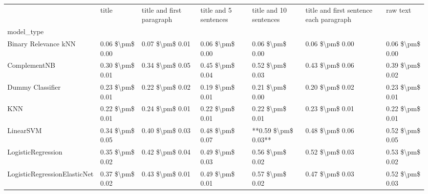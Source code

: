 \begin{tabular}{lllllll}
\toprule
{} &            title & title and first paragraph & title and 5 sentences & title and 10 sentences & title and first sentence each paragraph &         raw text \\
model\_type                      &                  &                           &                       &                        &                                         &                  \\
\midrule
Binary Relevance kNN            &  0.06 \$\textbackslash pm\$ 0.00 &           0.07 \$\textbackslash pm\$ 0.01 &       0.06 \$\textbackslash pm\$ 0.00 &        0.06 \$\textbackslash pm\$ 0.00 &                         0.06 \$\textbackslash pm\$ 0.00 &  0.06 \$\textbackslash pm\$ 0.00 \\
ComplementNB                    &  0.30 \$\textbackslash pm\$ 0.01 &           0.34 \$\textbackslash pm\$ 0.05 &       0.45 \$\textbackslash pm\$ 0.04 &        0.52 \$\textbackslash pm\$ 0.03 &                         0.43 \$\textbackslash pm\$ 0.06 &  0.39 \$\textbackslash pm\$ 0.02 \\
Dummy Classifier                &  0.23 \$\textbackslash pm\$ 0.01 &           0.22 \$\textbackslash pm\$ 0.02 &       0.19 \$\textbackslash pm\$ 0.01 &        0.21 \$\textbackslash pm\$ 0.00 &                         0.20 \$\textbackslash pm\$ 0.02 &  0.23 \$\textbackslash pm\$ 0.01 \\
KNN                             &  0.22 \$\textbackslash pm\$ 0.01 &           0.24 \$\textbackslash pm\$ 0.01 &       0.22 \$\textbackslash pm\$ 0.01 &        0.22 \$\textbackslash pm\$ 0.01 &                         0.23 \$\textbackslash pm\$ 0.01 &  0.22 \$\textbackslash pm\$ 0.01 \\
LinearSVM                       &  0.34 \$\textbackslash pm\$ 0.05 &           0.40 \$\textbackslash pm\$ 0.03 &       0.48 \$\textbackslash pm\$ 0.07 &    **0.59 \$\textbackslash pm\$ 0.03** &                         0.48 \$\textbackslash pm\$ 0.06 &  0.52 \$\textbackslash pm\$ 0.05 \\
LogisticRegression              &  0.35 \$\textbackslash pm\$ 0.02 &           0.42 \$\textbackslash pm\$ 0.04 &       0.49 \$\textbackslash pm\$ 0.03 &        0.56 \$\textbackslash pm\$ 0.02 &                         0.52 \$\textbackslash pm\$ 0.03 &  0.53 \$\textbackslash pm\$ 0.02 \\
LogisticRegressionElasticNet    &  0.37 \$\textbackslash pm\$ 0.02 &           0.43 \$\textbackslash pm\$ 0.01 &       0.49 \$\textbackslash pm\$ 0.01 &        0.57 \$\textbackslash pm\$ 0.02 &                         0.47 \$\textbackslash pm\$ 0.03 &  0.52 \$\textbackslash pm\$ 0.03 \\

\end{tabular}
